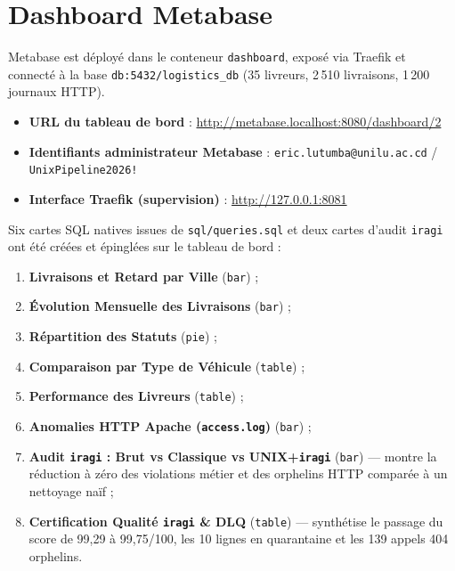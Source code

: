 \documentclass[11pt,a4paper]{article}
\begin{document}
\section{Dashboard Metabase}
Metabase est d\'eploy\'e dans le conteneur \texttt{dashboard}, expos\'e via Traefik et connect\'e \`a la base \texttt{db:5432/logistics\_db} (35 livreurs, 2\,510 livraisons, 1\,200 journaux HTTP).

\begin{itemize}
    \item \textbf{URL du tableau de bord} : \url{http://metabase.localhost:8080/dashboard/2}
    \item \textbf{Identifiants administrateur Metabase} : \texttt{eric.lutumba@unilu.ac.cd} / \texttt{UnixPipeline2026!}
    \item \textbf{Interface Traefik (supervision)} : \url{http://127.0.0.1:8081}
\end{itemize}

Six cartes SQL natives issues de \texttt{sql/queries.sql} et deux cartes d'audit \texttt{iragi} ont \'et\'e cr\'e\'ees et \'epingl\'ees sur le tableau de bord :
\begin{enumerate}
    \item \textbf{Livraisons et Retard par Ville} (\texttt{bar}) ;
    \item \textbf{\'Evolution Mensuelle des Livraisons} (\texttt{bar}) ;
    \item \textbf{R\'epartition des Statuts} (\texttt{pie}) ;
    \item \textbf{Comparaison par Type de V\'ehicule} (\texttt{table}) ;
    \item \textbf{Performance des Livreurs} (\texttt{table}) ;
    \item \textbf{Anomalies HTTP Apache (\texttt{access.log})} (\texttt{bar}) ;
    \item \textbf{Audit \texttt{iragi} : Brut vs Classique vs UNIX+\texttt{iragi}} (\texttt{bar}) --- montre la r\'eduction \`a z\'ero des violations m\'etier et des orphelins HTTP compar\'ee \`a un nettoyage na\"if ;
    \item \textbf{Certification Qualit\'e \texttt{iragi} \& DLQ} (\texttt{table}) --- synth\'etise le passage du score de 99,29 \`a 99,75/100, les 10 lignes en quarantaine et les 139 appels 404 orphelins.
\end{enumerate}
\end{document}

